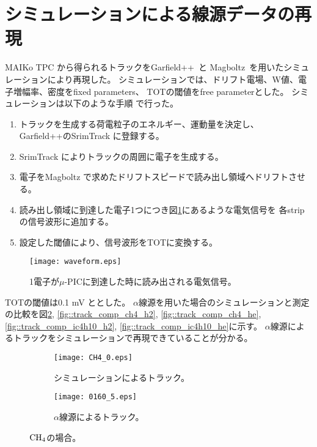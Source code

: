 \documentclass[../master]{subfiles}
\begin{document}
\section{シミュレーションによる線源データの再現}
MAIKo TPC から得られるトラックをGarfield++~\cite{garfield++}と
Magboltz~\cite{magboltz}を用いたシミュレーションにより再現した。
シミュレーションでは、ドリフト電場、W値、電子増幅率、密度をfixed parameters、
TOTの閾値をfree parameterとした。
シミュレーションは以下のような手順%
で行った。
\begin{enumerate}
\item\label{sim::particle_generate}
  トラックを生成する荷電粒子のエネルギー、運動量を決定し、
  Garfield++のSrimTrack に登録する。
\item
  SrimTrack によりトラックの周囲に電子を生成する。
\item
  電子をMagboltz で求めたドリフトスピードで読み出し領域へドリフトさせる。
\item
  読み出し領域に到達した電子1つにつき図\ref{fig::mu-pic_readout}にあるような電気信号を
  各strip の信号波形に追加する。
\item
  設定した閾値により、信号波形をTOTに変換する。
\end{enumerate}
\begin{figure}
  \centering
  \texttt{[image: waveform.eps]}
  \caption{1電子が$\mu$-PICに到達した時に読み出される電気信号。}
  \label{fig::mu-pic_readout}
\end{figure}
TOTの閾値は0.1 mV ととした。
$\alpha$線源を用いた場合のシミュレーションと測定の比較を図\ref{fig::track_comp_ch4},
\ref{fig::track_comp_ch4_h2}, \ref{fig::track_comp_ch4_he}, 
\ref{fig::track_comp_ic4h10_h2}, \ref{fig::track_comp_ic4h10_he}に示す。
$\alpha$線源によるトラックをシミュレーションで再現できていることが分かる。
\begin{figure}
  \centering
  \begin{subfigure}{0.48\columnwidth}
    \centering
    \texttt{[image: CH4\_0.eps]}
    \caption{シミュレーションによるトラック。}
  \end{subfigure}
  \begin{subfigure}{0.48\columnwidth}
    \centering
    \texttt{[image: 0160\_5.eps]}
    \caption{$\alpha$線源によるトラック。}
  \end{subfigure}
  \caption{$\rm CH_{4}$の場合。}
  \label{fig::track_comp_ch4}
\end{figure}
\end{document}

